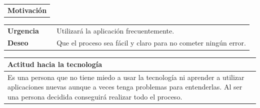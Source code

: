 \documentclass[11pt]{article}
\begin{document}
\begin{table}[H]
	\begin{tabular}{l}
		\textbf{Motivación} 
	\end{tabular}
	
	\begin{tabular}{p{0.2\linewidth}|p{0.8\linewidth}}
		\toprule
		\textbf{Urgencia} & Utilizará la aplicación frecuentemente.\\
		\textbf{Deseo}  & Que el proceso sea fácil y claro para no cometer ningún error.
		 \\
		\bottomrule
	\end{tabular}
	
	\begin{tabular}{p{1.028\linewidth}}
		\textbf{Actitud hacia la tecnología}\\
		\midrule
		Es una persona que no tiene miedo a usar la tecnología ni aprender a utilizar aplicaciones nuevas aunque a veces tenga problemas para entenderlas. Al ser una persona decidida conseguirá realizar todo el proceso.
		
	\end{tabular}
\end{table}
\end{document}
